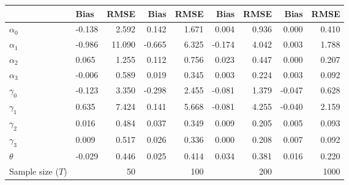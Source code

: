 
\begin{tabular}[t]{llrrrrrrr}
\toprule
  & Bias & RMSE & Bias & RMSE & Bias & RMSE & Bias & RMSE\\
\midrule
$\alpha_{0}$ & -0.138 & 2.592 & 0.142 & 1.671 & 0.004 & 0.936 & 0.000 & 0.410\\
$\alpha_{1}$ & -0.986 & 11.090 & -0.665 & 6.325 & -0.174 & 4.042 & 0.003 & 1.788\\
$\alpha_{2}$ & 0.065 & 1.255 & 0.112 & 0.756 & 0.023 & 0.447 & 0.000 & 0.207\\
$\alpha_{3}$ & -0.006 & 0.589 & 0.019 & 0.345 & 0.003 & 0.224 & 0.003 & 0.092\\
$\gamma_{0}$ & -0.123 & 3.350 & -0.298 & 2.455 & -0.081 & 1.379 & -0.047 & 0.628\\
$\gamma_{1}$ & 0.635 & 7.424 & 0.141 & 5.668 & -0.081 & 4.255 & -0.040 & 2.159\\
$\gamma_{2}$ & 0.016 & 0.484 & 0.037 & 0.349 & 0.009 & 0.205 & 0.005 & 0.093\\
$\gamma_{3}$ & 0.009 & 0.517 & 0.026 & 0.336 & 0.000 & 0.208 & 0.007 & 0.092\\
$\theta$ & -0.029 & 0.446 & 0.025 & 0.414 & 0.034 & 0.381 & 0.016 & 0.220\\
Sample size ($T$) &  & 50 &  & 100 &  & 200 &  & 1000\\
\bottomrule
\end{tabular}
